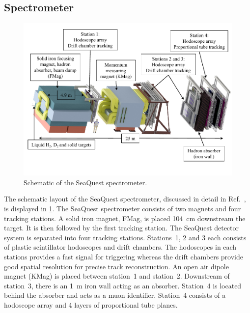 \documentclass[reprint,aps,unsortedaddress,superscriptaddress,prc,floatfix,showpacs,linenumbers,final]{revtex4-2}
\begin{document}
\subsection{Spectrometer}
\begin{figure}
	\centering
	\includegraphics[width=0.8\linewidth]{spectrometer/twoColumnSeaQuestSpectrometerNIM.pdf}
	\caption{Schematic of the SeaQuest spectrometer.}
	\label{fig:spectrometer}
\end{figure}
The schematic layout of the SeaQuest spectrometer, discussed in detail in Ref.~\cite{aidala2019},
is displayed in \cref{fig:spectrometer}.
The SeaQuest spectrometer consists of two magnets and four tracking stations.
A solid iron magnet,
FMag, is placed \SI{104}{\cm} downstream the target. It is then followed by
the first tracking station. The SeaQuest detector system is separated into four tracking stations.
Stations~1, 2 and 3 each consists of plastic scintillator hodoscopes and drift chambers.
The hodoscopes in each stations provides a fast signal for triggering whereas
the drift chambers provide good spatial resolution for precise track reconstruction.
An open air dipole magnet (KMag) is placed between station~1 and station~2.
Downstream of station~3, there is an \SI{1}{\meter} iron wall acting as an
absorber. Station~4 is located behind the  absorber and acts as a
muon identifier. Station~4 consists of a hodoscope array and 4 layers of
proportional tube planes.
\end{document}
